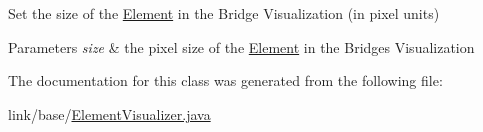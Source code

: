 Set the size of the \hyperlink{classbridges_1_1base_1_1_element}{Element} in the Bridge Visualization (in pixel units)


\begin{DoxyParams}{Parameters}
{\em size} & the pixel size of the \hyperlink{classbridges_1_1base_1_1_element}{Element} in the Bridges Visualization \\
\hline
\end{DoxyParams}


The documentation for this class was generated from the following file\+:\begin{DoxyCompactItemize}
\item 
link/base/\hyperlink{_element_visualizer_8java}{Element\+Visualizer.\+java}\end{DoxyCompactItemize}
